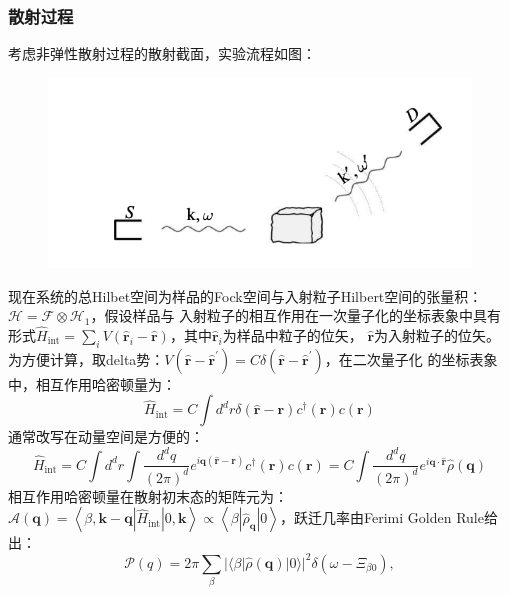 \documentclass[10pt,openany]{book}
\theoremstyle{thmstyle} %
\theoremstyle{defstyle} %
\theoremstyle{prostyle} %
\begin{document}
\subsubsection{散射过程}
考虑非弹性散射过程的散射截面，实验流程如图：
\begin{figure}[htbp]
  \centering
  \includegraphics*[scale=1]{Figures/EXPS.png}
\end{figure}
现在系统的总Hilbet空间为样品的Fock空间与入射粒子Hilbert空间的张量积：$ \mathcal{H}=\mathcal{F} \otimes \mathcal{H}_1 $，假设样品与
入射粒子的相互作用在一次量子化的坐标表象中具有形式$ \hat{H}_{\mathrm{int}}=\sum_i V\left(\hat{\mathbf{r}}_i-\hat{\mathbf{r}}\right) $，其中$ \hat{\mathbf{r}}_i $为样品中粒子的位矢，
$ \hat{\mathbf{r}} $为入射粒子的位矢。为方便计算，取delta势：$ V\left(\hat{\mathbf{r}}-\hat{\mathbf{r}}^{\prime}\right)=C \delta\left(\hat{\mathbf{r}}-\hat{\mathbf{r}}^{\prime}\right) $，在二次量子化
的坐标表象中，相互作用哈密顿量为：
\begin{equation}
  \hat{H}_{\mathrm{int}}=C \int d^d r \delta(\hat{\mathbf{r}}-\mathbf{r}) c^{\dagger}(\mathbf{r}) c(\mathbf{r})
\end{equation}    
通常改写在动量空间是方便的：
\begin{equation}
  \hat{H}_{\mathrm{int}}=C \int d^d r \int \frac{d^d q}{(2 \pi)^d} e^{i \mathbf{q}(\hat{\mathbf{r}}-\mathbf{r})} c^{\dagger}(\mathbf{r}) c(\mathbf{r})=C \int \frac{d^d q}{(2 \pi)^d} e^{i \mathbf{q} \cdot \hat{\mathbf{r}}} \hat{\rho}(\mathbf{q})
\end{equation}
相互作用哈密顿量在散射初末态的矩阵元为：$ \mathcal{A}(\mathbf{q})=\left\langle\beta, \mathbf{k}-\mathbf{q}\left|\hat{H}_{\mathrm{int}}\right| 0, \mathbf{k}\right\rangle \propto\left\langle\beta\left|\hat{\rho}_{\mathbf{q}}\right| 0\right\rangle $，跃迁几率由Ferimi Golden Rule给出：
\begin{equation}
  \mathcal{P}(q)=2 \pi \sum_\beta|\langle\beta|\hat{\rho}(\mathbf{q})| 0\rangle|^2 \delta\left(\omega-\Xi_{\beta 0}\right),
  \label{FGR}
\end{equation} 
\end{document}
